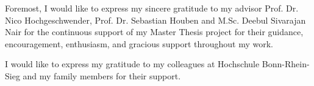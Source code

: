 




    \begin{acknowledgements}
        Foremost, I would like to express my sincere gratitude to my advisor Prof. Dr. Nico Hochgeschwender, Prof. Dr. Sebastian Houben and M.Sc. Deebul Sivarajan Nair for the continuous support of my Master Thesis project for their guidance, encouragement, enthusiasm, and gracious support throughout my work.
        
		I would like to express my gratitude to my colleagues at Hochschule Bonn-Rhein-Sieg and my family members for their support.
        
    \end{acknowledgements}

